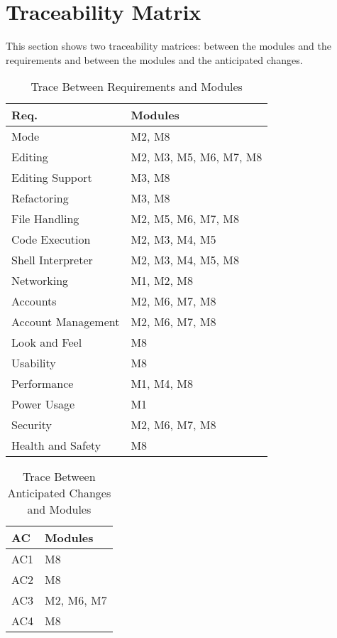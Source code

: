 \documentclass[12pt, titlepage]{article}
\begin{document}
\section{Traceability Matrix} \label{SecTM}

This section shows two traceability matrices: between the modules and the
requirements and between the modules and the anticipated changes.

\begin{table}[H]
\centering
\begin{tabular}{p{} p{}}
\toprule
\textbf{Req.} & \textbf{Modules}\\
\midrule
    Mode & M2, M8\\
    Editing & M2, M3, M5, M6, M7, M8\\
    Editing Support & M3, M8\\
    Refactoring & M3, M8\\
    File Handling & M2, M5, M6, M7, M8\\
    Code Execution & M2, M3, M4, M5\\
    Shell Interpreter & M2, M3, M4, M5, M8\\
    Networking & M1, M2, M8\\
    Accounts & M2, M6, M7, M8\\
    Account Management & M2, M6, M7, M8\\
    Look and Feel & M8\\
    Usability & M8\\
    Performance & M1, M4, M8\\
    Power Usage & M1\\
    Security & M2, M6, M7, M8\\
    Health and Safety & M8\\
\bottomrule
\end{tabular}
\caption{Trace Between Requirements and Modules}
\label{TblRT}
\end{table}

\begin{table}[H]
\centering
\begin{tabular}{p{} p{}}
\toprule
\textbf{AC} & \textbf{Modules}\\
\midrule
    AC1 & M8\\
    AC2 & M8\\
    AC3 & M2, M6, M7\\
    AC4 & M8\\
\bottomrule
\end{tabular}
\caption{Trace Between Anticipated Changes and Modules}
\label{TblACT}
\end{table}
\end{document}
